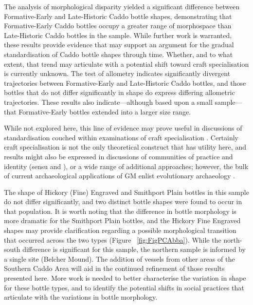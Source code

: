 \documentclass[review]{elsarticle}
\begin{document}
The analysis of morphological disparity yielded a significant difference between Formative-Early and Late-Historic Caddo bottle shapes, demonstrating that Formative-Early Caddo bottles occupy a greater range of morphospace than Late-Historic Caddo bottles in the sample. While further work is warranted, these results provide evidence that may support an argument for the gradual standardisation of Caddo bottle shapes through time. Whether, and to what extent, that trend may articulate with a potential shift toward craft specialisation is currently unknown. The test of allometry indicates significantly divergent trajectories between Formative-Early and Late-Historic Caddo bottles, and those bottles that do not differ significantly in shape do express differing allometric trajectories. These results also indicate---although based upon a small sample---that Formative-Early bottles extended into a larger size range. 

While not explored here, this line of evidence may prove useful in discussions of standardisation \citep{RN11631} couched within examinations of craft specialisation \citep{RN29,RN250,RN28,RN18,RN1989}. Certainly craft specialisation is not the only theoretical construct that has utility here, and results might also be expressed in discussions of communities of practice and identity (sensu \citet{RN11666} and \citet{RN11602}), or a wide range of additional approaches; however, the bulk of current archaeological applications of GM enlist evolutionary archaeology \citep{RN1742,RN11779}. 

The shape of Hickory (Fine) Engraved and Smithport Plain bottles in this sample do not differ significantly, and two distinct bottle shapes were found to occur in that population. It is worth noting that the difference in bottle morphology is more dramatic for the Smithport Plain bottles, and the Hickory Fine Engraved shapes may provide clarification regarding a possible morphological transition that occurred across the two types (Figure ~\ref{fig:FigPCAbba}). While the north-south difference is significant for this sample, the northern sample is informed by a single site (Belcher Mound). The addition of vessels from other areas of the Southern Caddo Area will aid in the continued refinement of those results presented here. More work is needed to better characterise the variation in shape for these bottle types, and to identify the potential shifts in social practices that articulate with the variations in bottle morphology.
\end{document}
